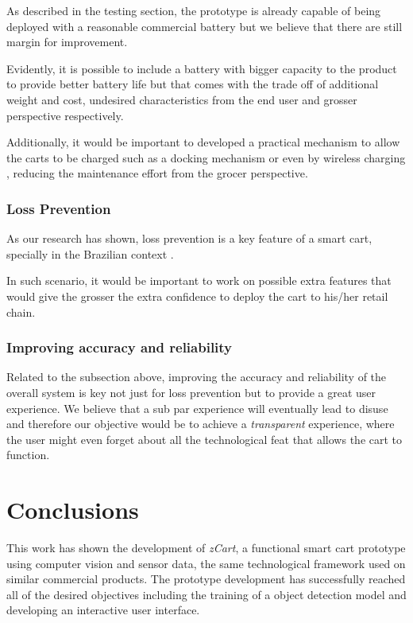 \documentclass[openright]{normas-utf-tex} %
\begin{document}
As described in the testing section, the prototype is already capable of being
deployed with a reasonable commercial battery but we believe that there are
still margin for improvement.

Evidently, it is possible to include a battery with bigger capacity to the
product to provide better battery life but that comes with the trade off of
additional weight and cost, undesired characteristics from the end user and
grosser perspective respectively.

Additionally, it would be important to developed a practical mechanism to allow
the carts to be charged such as a docking mechanism or even by wireless
charging \cite{Treffers2015}, reducing the maintenance effort from the grocer
perspective. 

\subsection{Loss Prevention}

As our research has shown, loss prevention is a key feature of a smart cart, specially in the Brazilian context
\cite{Nextop2022}.

In such scenario, it would be important to work on possible extra features that
would give the grosser the extra confidence to deploy the cart to his/her retail
chain.

\subsection{Improving accuracy and reliability}

Related to the subsection above, improving the accuracy and reliability of the
overall system is key not just for loss prevention but to provide a great user
experience. We believe that a sub par experience will eventually lead to disuse
and therefore our objective would be to achieve a \textit{transparent}
experience, where the user might even forget about all the technological feat
that allows the cart to function.

\chapter{Conclusions}

This work has shown the development of \textit{zCart}, a functional smart cart
prototype using computer vision and sensor data, the same technological
framework used on similar commercial products. The prototype development has
successfully reached all of the desired objectives including the training of a
object detection model and developing an interactive user interface.
\end{document}
